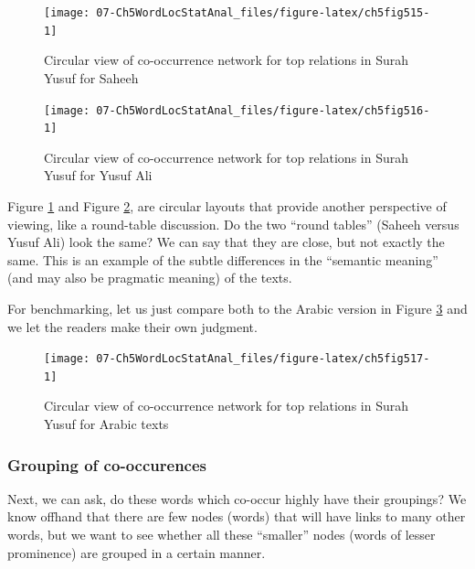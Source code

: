\documentclass[
]{article}
\begin{document}
\begin{figure}

{\centering \texttt{[image: 07-Ch5WordLocStatAnal\_files/figure-latex/ch5fig515-1]} 

}

\caption{Circular view of co-occurrence network for top relations in Surah Yusuf for Saheeh}\label{fig:ch5fig515}
\end{figure}

\begin{figure}

{\centering \texttt{[image: 07-Ch5WordLocStatAnal\_files/figure-latex/ch5fig516-1]} 

}

\caption{Circular view of co-occurrence network for top relations in Surah Yusuf for Yusuf Ali}\label{fig:ch5fig516}
\end{figure}

Figure \ref{fig:ch5fig515} and Figure \ref{fig:ch5fig516}, are circular layouts that provide another perspective of viewing, like a round-table discussion. Do the two ``round tables'' (Saheeh versus Yusuf Ali) look the same? We can say that they are close, but not exactly the same. This is an example of the subtle differences in the ``semantic meaning'' (and may also be pragmatic meaning) of the texts.

For benchmarking, let us just compare both to the Arabic version in Figure \ref{fig:ch5fig517} and we let the readers make their own judgment.

\begin{figure}

{\centering \texttt{[image: 07-Ch5WordLocStatAnal\_files/figure-latex/ch5fig517-1]} 

}

\caption{Circular view of co-occurrence network for top relations in Surah Yusuf for Arabic texts}\label{fig:ch5fig517}
\end{figure}

\hypertarget{grouping-of-co-occurences}{%
\subsubsection{Grouping of co-occurences}\label{grouping-of-co-occurences}}

Next, we can ask, do these words which co-occur highly have their groupings? We know offhand that there are few nodes (words) that will have links to many other words, but we want to see whether all these ``smaller'' nodes (words of lesser prominence) are grouped in a certain manner.
\end{document}
